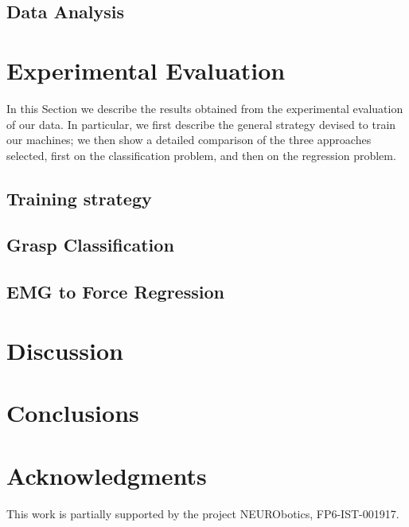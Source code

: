 \documentclass[journal]{IEEEtran}
\begin{document}
\subsection{Data Analysis}
\label{subsec:analysis}


\section{Experimental Evaluation}
\label{sec:exp}

In this Section we describe the results obtained from the experimental
evaluation of our data. In particular, we first describe the general
strategy devised to train our machines; we then show a detailed
comparison of the three approaches selected, first on the
classification problem, and then on the regression problem.

\subsection{Training strategy}
\label{subsec:strategy}


\subsection{Grasp Classification}
\label{subsec:classification}


\subsection{EMG to Force Regression}
\label{subsec:regression}


\section{Discussion}
\label{sec:discussion}


\section{Conclusions}
\label{sec:conclusions}



\section*{Acknowledgments}

This work is partially supported by the project NEURObotics,
FP6-IST-001917.
\end{document}
